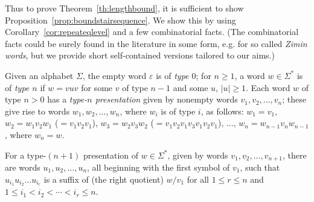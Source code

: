 \documentclass[12pt]{article}
\begin{document}
\noindent
Thus to prove Theorem~\ref{th:lengthbound}, it is sufficient to show
Proposition~\ref{prop:boundstairsequence}.
We show this by using Corollary~\ref{cor:repeateqlevel} and
a few combinatorial facts. 
(The combinatorial facts could be surely found in the literature in
some form, e.g. for so called \emph{Zimin words},
but we provide 
short self-contained versions tailored to our aims.)



\begin{defn}\label{def:typewords}
Given an 
alphabet $\Sigma$, the empty word 
$\varepsilon$ is of \emph{type $0$};
for $n\geq 1$, a word $w\in\Sigma^*$ is of \emph{type $n$} if $w=vuv$
for some $v$ of type $n{-}1$ and some $u$, $|u|\geq 1$.
Each word $w$ of type $n>0$ has 
a \emph{type-$n$ presentation} given by
nonempty words $v_1,v_2,\dots,v_n$; these give rise to words
$w_1,w_2,\dots,w_n$, where $w_i$ is of type $i$, as follows: 
$w_1=v_1$, $w_2=w_1v_2w_1$ ($=v_1v_2v_1$),
$w_3=w_2v_3w_2$ ($=v_1v_2v_1v_3v_1v_2v_1$), $\dots$,
$w_n=w_{n-1}v_nw_{n-1}$, where $w_n=w$.
\end{defn}

\begin{prop}\label{prop:prefixyielding}
For a type-$(n{+}1)$ presentation of $w\in\Sigma^*$,
given by words $v_1,v_2,\dots,v_{n+1}$, there are words 
$u_1,u_2,\dots,u_n$, all beginning 
with the first symbol of $v_1$,
such that 
$u_{i_1}u_{i_2}\dots u_{i_r}$ is a suffix of
(the right quotient)
$w/v_1$
for all $1\leq r\leq n$ and $1\leq i_1<i_2<\cdots < i_r\leq n$.
\end{prop}
\end{document}
